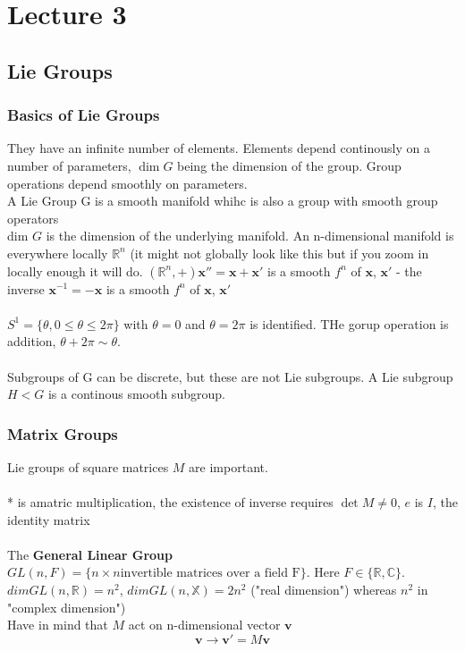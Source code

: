 \documentclass{article}
\begin{document}
{\section{Lecture 3}
\subsection{Lie Groups}
\subsubsection{Basics of Lie Groups}
They have an infinite number of elements. Elements depend continously on a number of parameters, $\dim G$ being the dimension of the group. Group operations depend smoothly on parameters.\\
A Lie Group G is a smooth manifold whihc is also a group with smooth group operators\\
dim $G$ is the dimension of the underlying manifold. An n-dimensional manifold is everywhere locally $\mathbb{R}^n$ (it might not globally look like this but if you zoom in locally enough it will do.
$ (\mathbb{R}^n, +) \bm x'' = \bm x + \bm x'$ is a smooth $f^n$ of $\bm x$, $\bm x'$ - the inverse $\bm x^{-1} = - \bm x$ is a smooth $f^n$ of $\bm x$, $\bm x'$\\\\
$S^1 = \{\theta, 0 \leq \theta \leq 2\pi\}$ with $\theta = 0$ and $\theta = 2\pi$ is identified. THe gorup operation is addition, $\theta + 2\pi \sim \theta$.\\\\
Subgroups of G can be discrete, but these are not Lie subgroups. A Lie subgroup $H < G$ is a continous smooth subgroup.
\subsubsection{Matrix Groups}
Lie groups of square matrices $M$ are important.\\\\
* is amatric multiplication, the existence of inverse requires $\det M \neq 0$, $e$ is $I$, the identity matrix\\\\
The \textbf{General Linear Group} $GL(n, F) = \{ n \times n \text{invertible matrices over a field F}\}$. Here $F \in \{\mathbb{R}, \mathbb{C}\}$.
$
dim GL(n, \mathbb{R}) = n^2
$, 
$
dim GL(n, \mathbb{X}) = 2n^2 
$ ("real dimension") whereas $n^2$ in "complex dimension")\\
Have in mind that $M$ act on n-dimensional vector $\bm v$
$$
\bm v \rightarrow \bm v' = M\bm v
$$
}
\end{document}

